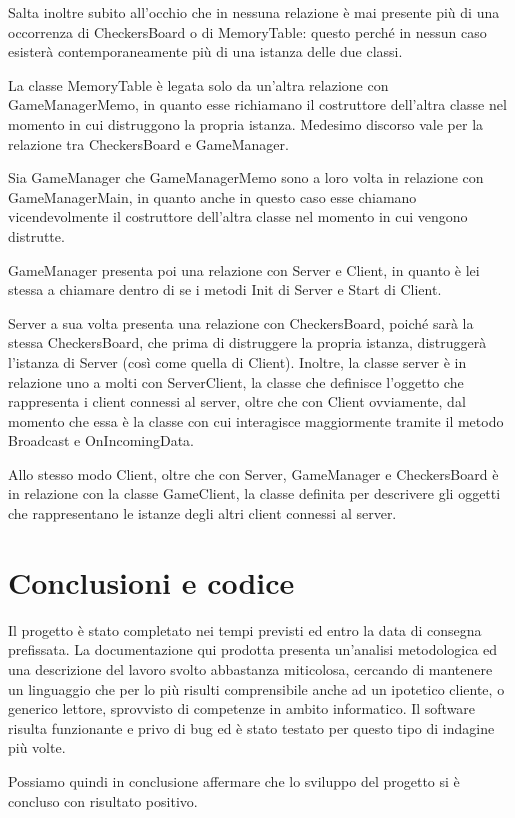 \documentclass[12pt]{article}
\begin{document}
Salta inoltre subito all'occhio che in nessuna relazione è mai presente più di una occorrenza di CheckersBoard o di MemoryTable: questo perché in nessun caso esisterà contemporaneamente più di una istanza delle due classi.

La classe MemoryTable è legata solo da un'altra relazione con GameManagerMemo, in quanto esse richiamano il costruttore dell'altra classe nel momento in cui distruggono la propria istanza. Medesimo discorso vale per la relazione tra CheckersBoard e GameManager.

Sia GameManager che GameManagerMemo sono a loro volta in relazione con GameManagerMain, in quanto anche in questo caso esse chiamano vicendevolmente il costruttore dell'altra classe nel momento in cui vengono distrutte.

GameManager presenta poi una relazione con Server e Client, in quanto è lei stessa a chiamare dentro di se i metodi Init di Server e Start di Client.

Server a sua volta presenta una relazione con CheckersBoard, poiché sarà la stessa CheckersBoard, che prima di distruggere la propria istanza, distruggerà l'istanza di Server (così come quella di Client). Inoltre, la classe server è in relazione uno a molti con ServerClient, la classe che definisce l'oggetto che rappresenta i client connessi al server, oltre che con Client ovviamente, dal momento che essa è la classe con cui interagisce maggiormente tramite il metodo Broadcast e OnIncomingData.

Allo stesso modo Client, oltre che con Server, GameManager e CheckersBoard è in relazione con la classe GameClient, la classe definita per descrivere gli oggetti che rappresentano le istanze degli altri client connessi al server.

\section{Conclusioni e codice}
Il progetto è stato completato nei tempi previsti ed entro la data di consegna prefissata. La documentazione qui prodotta presenta un'analisi metodologica ed una descrizione del lavoro svolto abbastanza miticolosa, cercando di mantenere un linguaggio che per lo più risulti comprensibile anche ad un ipotetico cliente, o generico lettore, sprovvisto di competenze in ambito informatico. Il software risulta funzionante e privo di bug ed è stato testato per questo tipo di indagine più volte.

Possiamo quindi in conclusione affermare che lo sviluppo del progetto si è concluso con risultato positivo.
\end{document}
